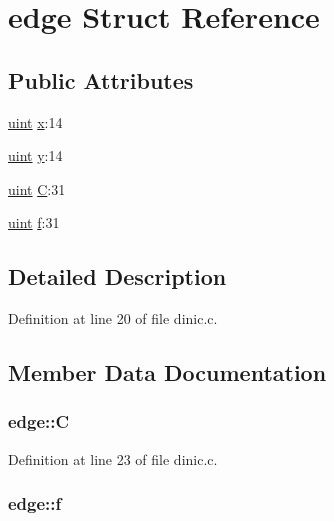 \hypertarget{structedge}{
\section{edge Struct Reference}
\label{structedge}
}
\subsection*{Public Attributes}
\begin{DoxyCompactItemize}
\item 
\hyperlink{dinic_8c_a91ad9478d81a7aaf2593e8d9c3d06a14}{uint} \hyperlink{structedge_ac917d6c1141dc02c8226ff4ba91a3e3f}{x}:14
\item 
\hyperlink{dinic_8c_a91ad9478d81a7aaf2593e8d9c3d06a14}{uint} \hyperlink{structedge_ae1a800d243b7d9e6cddef1031a02237f}{y}:14
\item 
\hyperlink{dinic_8c_a91ad9478d81a7aaf2593e8d9c3d06a14}{uint} \hyperlink{structedge_ae11bfddc7f90d5ed4901356a96acd2a2}{C}:31
\item 
\hyperlink{dinic_8c_a91ad9478d81a7aaf2593e8d9c3d06a14}{uint} \hyperlink{structedge_a1a9285974498ae998cd987051083f3a4}{f}:31
\end{DoxyCompactItemize}


\subsection{Detailed Description}


Definition at line 20 of file dinic.c.



\subsection{Member Data Documentation}
\hypertarget{structedge_ae11bfddc7f90d5ed4901356a96acd2a2}{
\subsubsection[{C}]{ {\bf edge::C}}}
\label{structedge_ae11bfddc7f90d5ed4901356a96acd2a2}


Definition at line 23 of file dinic.c.

\hypertarget{structedge_a1a9285974498ae998cd987051083f3a4}{
\subsubsection[{f}]{ {\bf edge::f}}}
\label{structedge_a1a9285974498ae998cd987051083f3a4}


